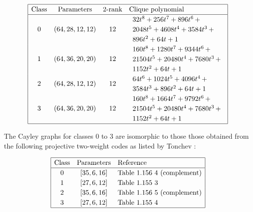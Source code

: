 \documentclass[12pt,a4paper]{article}
\begin{document}
\small{}
\begin{align*}
\def\arraystretch{1.2}
\begin{array}{|cccl|}
\hline
\text{Class} &
\text{Parameters} &
\text{2-rank} &
\text{Clique polynomial}
\\
\hline
0 &
(64, 28, 12, 12) &
12 &
\begin{array}{l}
32t^{8} + 256t^{7} + 896t^{6}
\,+
\\
 2048t^{5} + 4608t^{4} + 3584t^{3}
\,+
\\
 896t^{2} + 64t + 1
\end{array}
\\
1 &
(64, 36, 20, 20) &
12 &
\begin{array}{l}
160t^{8} + 1280t^{7} + 9344t^{6}
\,+
\\
 21504t^{5} + 20480t^{4} + 7680t^{3}
\,+
\\
 1152t^{2} + 64t + 1
\end{array}
\\
2 &
(64, 28, 12, 12) &
12 &
\begin{array}{l}
64t^{6} + 1024t^{5} + 4096t^{4}
\,+
\\
 3584t^{3} + 896t^{2} + 64t + 1
\end{array}
\\
3 &
(64, 36, 20, 20) &
12 &
\begin{array}{l}
160t^{8} + 1664t^{7} + 9792t^{6}
\,+
\\
 21504t^{5} + 20480t^{4} + 7680t^{3}
\,+
\\
 1152t^{2} + 64t + 1
\end{array}
\\
\hline
\end{array}
\end{align*}

The Cayley graphs for classes 0 to 3 are isomorphic to those those obtained from the following
projective two-weight
codes as listed by Tonchev \cite{Ton07codes}:

\begin{align*}
\def\arraystretch{1.2}
\begin{array}{|ccl|}
\hline
\text{Class} &
\text{Parameters} & \text{Reference}
\\
\hline
0 & [35,6,16] & \text{Table 1.156 4 (complement)}
\\
1 & [27,6,12] & \text{Table 1.155 3 }
\\
2 & [35,6,16] & \text{Table 1.156 5 (complement)}
\\
3 & [27,6,12] & \text{Table 1.155 4 }
\\
\hline
\end{array}
\end{align*}
\end{document}
